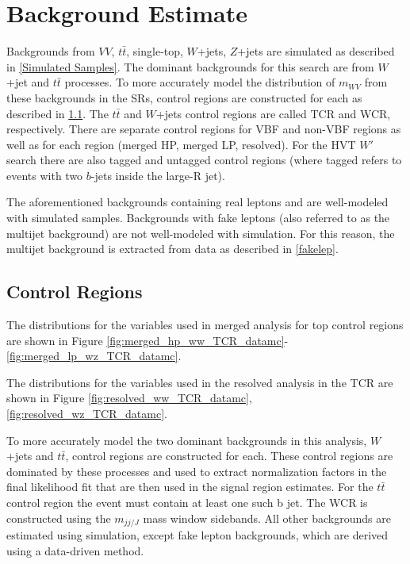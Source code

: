 \section{Background Estimate}
Backgrounds from $VV$, $t\bar{t}$, single-top, $W$+jets, $Z$+jets are simulated as described in \ref{Simulated Samples}. The dominant backgrounds for this search are from $W$+jet and $t\bar{t}$ processes. To more accurately model the distribution of $m_{WV}$ from these backgrounds in the SRs, control regions are constructed for each as described in \ref{crs}. The $t\bar{t}$ and $W$+jets control regions are called TCR and WCR, respectively. There are separate control regions for VBF and non-VBF regions as well as for each region (merged HP, merged LP, resolved). For the HVT $W'$ search there are also tagged and untagged control regions (where tagged refers to events with two $b$-jets inside the large-R jet). 

The aforementioned backgrounds containing real leptons and are well-modeled with simulated samples. Backgrounds with fake leptons (also referred to as the multijet background) are not well-modeled with simulation. For this reason, the multijet background is extracted from data as described in \ref{fakelep}.

\subsection{Control Regions}
\label{crs}
The distributions for the variables used in merged analysis for top control regions are shown in Figure \ref{fig:merged_hp_ww_TCR_datamc}-\ref{fig:merged_lp_wz_TCR_datamc}.

The distributions for the variables used in the resolved analysis in the TCR are shown in Figure \ref{fig:resolved_ww_TCR_datamc}, \ref{fig:resolved_wz_TCR_datamc}.

To more accurately model the two dominant backgrounds in this analysis, $W$+jets and $t\bar{t}$, control regions are constructed for each. These control regions are dominated by these processes and used to extract normalization factors in the final likelihood fit that are then used in the signal region estimates. For the $t\bar{t}$ control region the event must contain at least one such b jet. The WCR is constructed using the $m_{jj/J}$ mass window sidebands. All other backgrounds are estimated using simulation, except fake lepton backgrounds, which are derived using a data-driven method.


